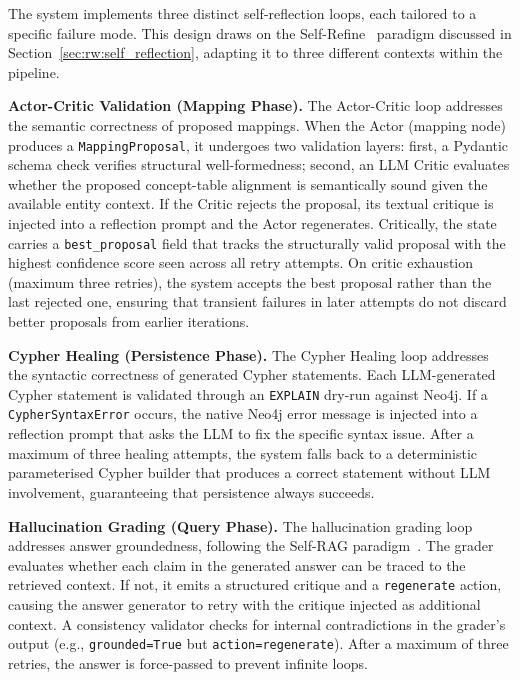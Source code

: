 The system implements three distinct self-reflection loops, each tailored to a specific failure mode. This design draws on the Self-Refine~\cite{madaan2023selfrefineiterativerefinementselffeedback} paradigm discussed in Section~\ref{sec:rw:self_reflection}, adapting it to three different contexts within the pipeline.

\textbf{Actor-Critic Validation (Mapping Phase).} The Actor-Critic loop addresses the semantic correctness of proposed mappings. When the Actor (mapping node) produces a \texttt{MappingProposal}, it undergoes two validation layers: first, a Pydantic schema check verifies structural well-formedness; second, an LLM Critic evaluates whether the proposed concept-table alignment is semantically sound given the available entity context. If the Critic rejects the proposal, its textual critique is injected into a reflection prompt and the Actor regenerates. Critically, the state carries a \texttt{best\_proposal} field that tracks the structurally valid proposal with the highest confidence score seen across all retry attempts. On critic exhaustion (maximum three retries), the system accepts the best proposal rather than the last rejected one, ensuring that transient failures in later attempts do not discard better proposals from earlier iterations.

\textbf{Cypher Healing (Persistence Phase).} The Cypher Healing loop addresses the syntactic correctness of generated Cypher statements. Each LLM-generated Cypher statement is validated through an \texttt{EXPLAIN} dry-run against Neo4j. If a \texttt{CypherSyntaxError} occurs, the native Neo4j error message is injected into a reflection prompt that asks the LLM to fix the specific syntax issue. After a maximum of three healing attempts, the system falls back to a deterministic parameterised Cypher builder that produces a correct statement without LLM involvement, guaranteeing that persistence always succeeds.

\textbf{Hallucination Grading (Query Phase).} The hallucination grading loop addresses answer groundedness, following the Self-RAG paradigm~\cite{asai2023selfraglearningretrievegenerate}. The grader evaluates whether each claim in the generated answer can be traced to the retrieved context. If not, it emits a structured critique and a \texttt{regenerate} action, causing the answer generator to retry with the critique injected as additional context. A consistency validator checks for internal contradictions in the grader's output (e.g., \texttt{grounded=True} but \texttt{action=regenerate}). After a maximum of three retries, the answer is force-passed to prevent infinite loops.

